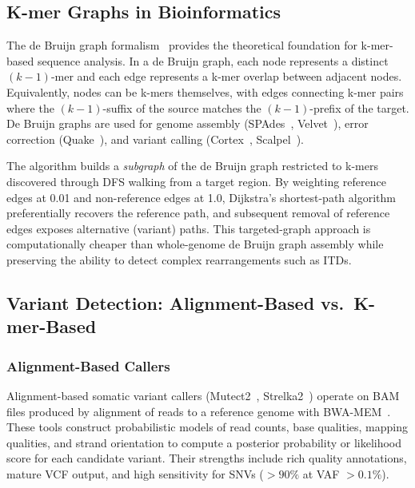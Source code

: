 \subsection{K-mer Graphs in Bioinformatics}

The de Bruijn graph formalism~\cite{zerbino2008velvet,bankevich2012spades} provides
the theoretical foundation for k-mer-based sequence analysis.  In a de Bruijn
graph, each node represents a distinct $(k-1)$-mer and each edge represents a
k-mer overlap between adjacent nodes.  Equivalently, nodes can be k-mers
themselves, with edges connecting k-mer pairs where the $(k-1)$-suffix of the
source matches the $(k-1)$-prefix of the target.  De Bruijn graphs are used for
genome assembly (SPAdes~\cite{bankevich2012spades}, Velvet~\cite{zerbino2008velvet}),
error correction (Quake~\cite{kelley2010quake}), and variant calling
(Cortex~\cite{iqbal2012novo}, Scalpel~\cite{narzisi2014accurate}).

The \km{} algorithm builds a \emph{subgraph} of the de Bruijn graph restricted
to k-mers discovered through DFS walking from a target region.  By weighting
reference edges at 0.01 and non-reference edges at 1.0, Dijkstra's shortest-path
algorithm preferentially recovers the reference path, and subsequent removal of
reference edges exposes alternative (variant) paths.  This targeted-graph approach
is computationally cheaper than whole-genome de Bruijn graph assembly while
preserving the ability to detect complex rearrangements such as ITDs.

\subsection{Variant Detection: Alignment-Based vs.\ K-mer-Based}

\subsubsection{Alignment-Based Callers}

Alignment-based somatic variant callers (Mutect2~\cite{cibulskis2013mutect},
Strelka2~\cite{saunders2012strelka}) operate on BAM files produced by alignment
of reads to a reference genome with BWA-MEM~\cite{li2009bwa}.  These tools
construct probabilistic models of read counts, base qualities, mapping qualities,
and strand orientation to compute a posterior probability or likelihood score for
each candidate variant.  Their strengths include rich quality annotations, mature
VCF output, and high sensitivity for SNVs ($>90\%$ at VAF $>0.1\%$).

